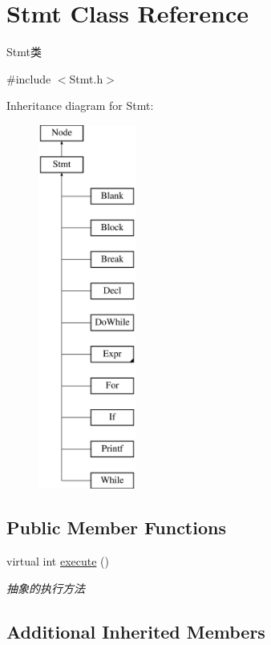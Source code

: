 \hypertarget{class_stmt}{}\section{Stmt Class Reference}
\label{class_stmt}


Stmt类  




{\ttfamily \#include $<$Stmt.\+h$>$}

Inheritance diagram for Stmt\+:\begin{figure}[H]
\begin{center}
\leavevmode
\includegraphics[height=12.000000cm]{class_stmt}
\end{center}
\end{figure}
\subsection*{Public Member Functions}
\begin{DoxyCompactItemize}
\item 
virtual int \hyperlink{class_stmt_abdc3261770c3c5bd3ce5b3ba6eedfaa4}{execute} ()
\begin{DoxyCompactList}\small\item\em 抽象的执行方法 \end{DoxyCompactList}\end{DoxyCompactItemize}
\subsection*{Additional Inherited Members}


